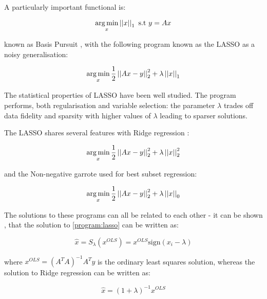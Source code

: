 A particularly important functional is:

\begin{equation}
\operatorname*{arg\,min}_x \left|\left|x\right|\right|_1 \text{ s.t } y=Ax
\label{program:bp}
\end{equation}

known as Basis Pursuit \cite{Chen1998a}, with the following program known as the LASSO \cite{tibshirani1996regression} as a noisy generalisation: 

\begin{equation}
\operatorname*{arg\,min}_x \frac{1}{2}\left|\left|Ax-y\right|\right|_2^2 + \lambda\left|\left|x\right|\right|_1
\label{program:lasso}
\end{equation}

The statistical properties of LASSO have been well studied. The program performs, both regularisation and variable selection: the parameter \(\lambda\) trades off data fidelity and sparsity with higher values of \(\lambda\) leading to sparser solutions. 

The LASSO shares several features with Ridge regression \cite{hoerl1970ridge}:

\begin{equation}
\operatorname*{arg\,min}_x \frac{1}{2}\left|\left|Ax-y\right|\right|_2^2 + \lambda\left|\left|x\right|\right|_2^2
\label{program:Ridge-regression}
\end{equation}

and the Non-negative garrote \cite{breiman1995better} used for best subset regression:

\begin{equation}
\operatorname*{arg\,min}_x \frac{1}{2}\left|\left|Ax-y\right|\right|_2^2 + \lambda\left|\left|x\right|\right|_0
\label{program:ell0}
\end{equation}

The solutions to these programs can all be related to each other - it can be shown \cite{hastie2005elements}, that the solution to \eqref{program:lasso} can be written as:

\begin{equation}
\hat{x} = S_{\lambda}\left(x^{OLS}\right) = x^{OLS} \mathrm{sign}\left(x_i - \lambda\right)
\label{soln:lasso}
\end{equation} 

where \(x^{OLS} = (A^TA)^{-1}A^Ty \) is the ordinary least squares solution, whereas the solution to Ridge regression can be written as:

\begin{equation}
\hat{x} = \left(1+\lambda\right)^{-1}x^{OLS}
\label{soln:ridge}
\end{equation}


